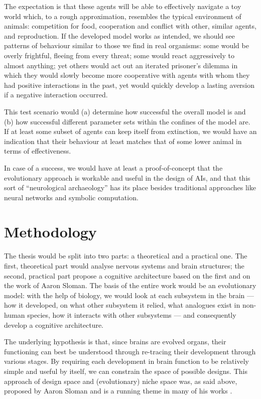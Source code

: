 \documentclass[bibliography=totoc ]{scrartcl}
\begin{document}
The expectation is that these agents will be able to effectively navigate a toy world which, to a rough approximation, resembles the typical environment of animals: competition for food, cooperation and conflict with other, similar agents, and reproduction. If the developed model works as intended, we should see patterns of behaviour similar to those we find in real organisms: some would be overly frightful, fleeing from every threat; some would react aggressively to almost anything; yet others would act out an iterated prisoner's dilemma in which they would slowly become more cooperative with agents with whom they had positive interactions in the past, yet would quickly develop a lasting aversion if a negative interaction occurred.

This test scenario would (a) determine how successful the overall model is and (b) how successful different parameter sets within the confines of the model are. If at least some subset of agents can keep itself from extinction, we would have an indication that their behaviour at least matches that of some lower animal in terms of effectiveness.

In case of a success, we would have at least a proof-of-concept that the evolutionary approach is workable and useful in the design of AIs, and that this sort of ``neurological archaeology'' has its place besides traditional approaches like neural networks and symbolic computation.

\section{Methodology}

The thesis would be split into two parts: a theoretical and a practical one. The first, theoretical part would analyse nervous systems and brain structures; the second, practical part propose a cognitive architecture based on the first and on the work of Aaron Sloman. The basis of the entire work would be an evolutionary model: with the help of biology, we would look at each subsystem in the brain --- how it developed, on what other subsystem it relied, what analogues exist in non-human species, how it interacts with other subsystems --- and consequently develop a cognitive architecture.

The underlying hypothesis is that, since brains are evolved organs, their functioning can best be understood through re-tracing their development through various stages. By requiring each development in brain function to be relatively simple and useful by itself, we can constrain the space of possible designs. This approach of design space and (evolutionary) niche space was, as said above, proposed by Aaron Sloman \cite{slomanNiche} and is a running theme in many of his works \cite{sloman2000, sloman1993, sloman1997}.
\end{document}
